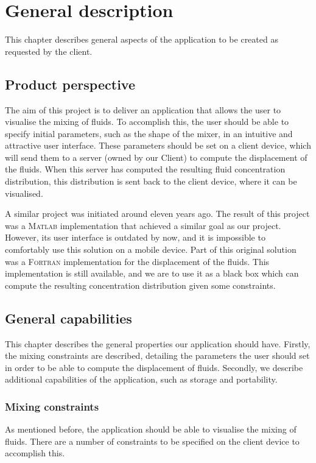 \chapter{General description}
This chapter describes general aspects of the application to be created as requested by the client.

\section{Product perspective} %
The aim of this project is to deliver an application that allows the user to visualise the mixing of fluids. To accomplish this, the user should be able to specify initial parameters, such as the shape of the mixer, in an intuitive and attractive user interface. These parameters should be set on a client device, which will send them to a server (owned by our Client) to compute the displacement of the fluids. When this server has computed the resulting fluid concentration distribution, this distribution is sent back to the client device, where it can be visualised.

A similar project was initiated around eleven years ago. The result of this project was a \textsc{Matlab} implementation that achieved a similar goal as our project. However, its user interface is outdated by now, and it is impossible to comfortably use this solution on a mobile device. Part of this original solution was a \textsc{Fortran} implementation for the displacement of the fluids. This implementation is still available, and we are to use it as a black box which can compute the resulting concentration distribution given some constraints.

\section{General capabilities}
This chapter describes the general properties our application should have. Firstly, the mixing constraints are described, detailing the parameters the user should set in order to be able to compute the displacement of fluids. Secondly, we describe additional capabilities of the application, such as storage and portability.

\subsection{Mixing constraints}\label{mixingconstraints}
As mentioned before, the application should be able to visualise the mixing of fluids. There are a number of constraints to be specified on the client device to accomplish this.
 
